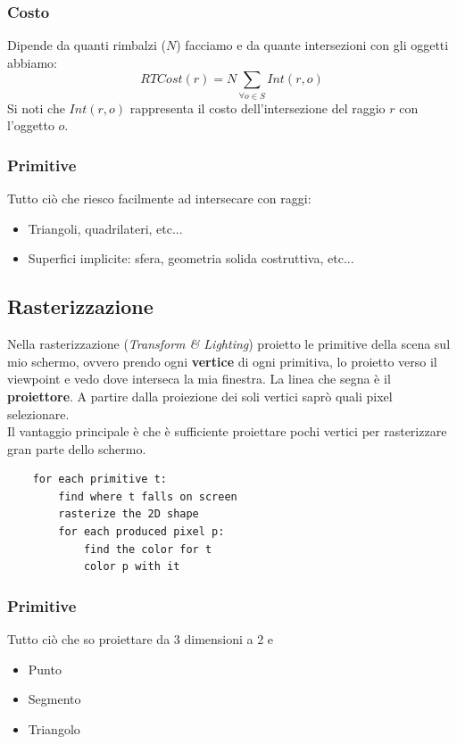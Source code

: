 \subsubsection{Costo}
Dipende da quanti rimbalzi ($N$) facciamo e da quante intersezioni con gli oggetti abbiamo:
\begin{equation}
	RTCost(r)=N \sum_{\forall o \in S} Int(r,o)
\end{equation}
Si noti che $Int(r,o)$ rappresenta il costo dell'intersezione del raggio $r$ con l'oggetto $o$.
\subsubsection{Primitive}
Tutto ciò che riesco facilmente ad intersecare con raggi:
\begin{itemize}
	\item Triangoli, quadrilateri, etc...
	\item Superfici implicite: sfera, geometria solida costruttiva, etc...
\end{itemize}

\subsection{Rasterizzazione}
Nella rasterizzazione (\textit{Transform \& Lighting}) proietto le primitive della scena sul mio schermo, ovvero prendo ogni \textbf{vertice} di ogni primitiva, lo proietto verso il viewpoint e vedo dove interseca la mia finestra. La linea che segna è il \textbf{proiettore}. A partire dalla proiezione dei soli vertici saprò quali pixel selezionare.\\
Il vantaggio principale è che è sufficiente proiettare pochi vertici per rasterizzare gran parte dello schermo.
\begin{lstlisting}
	for each primitive t:
		find where t falls on screen
		rasterize the 2D shape
		for each produced pixel p:
			find the color for t
			color p with it
\end{lstlisting}
\subsubsection{Primitive}
Tutto ciò che so proiettare da 3 dimensioni a 2 e 
\begin{itemize}
	\item Punto
	\item Segmento
	\item Triangolo
\end{itemize}
